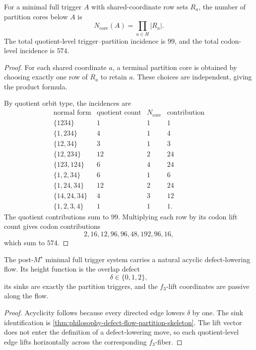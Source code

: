 \begin{theorem}
\label{thm:philosophy-partition-core-incidence}
For a minimal full trigger $A$ with shared-coordinate row sets $R_{a}$,
the number of partition cores below $A$ is
$$
  N_{\mathrm{core}}(A)
  =
  \prod_{a\in H}|R_{a}|.
$$
The total quotient-level trigger--partition incidence is $99$, and the
total codon-level incidence is $574$.
\end{theorem}
\begin{proof}
For each shared coordinate $a$, a terminal partition core is obtained by
choosing exactly one row of $R_{a}$ to retain $a$. These choices are
independent, giving the product formula.

By quotient orbit type, the incidences are
$$
\begin{array}{c|r|r|r}
  \text{normal form} & \text{quotient count} & N_{\mathrm{core}} & \text{contribution}\\
  \hline
  \{1234\} & 1 & 1 & 1\\
  \{1,234\} & 4 & 1 & 4\\
  \{12,34\} & 3 & 1 & 3\\
  \{12,234\} & 12 & 2 & 24\\
  \{123,124\} & 6 & 4 & 24\\
  \{1,2,34\} & 6 & 1 & 6\\
  \{1,24,34\} & 12 & 2 & 24\\
  \{14,24,34\} & 4 & 3 & 12\\
  \{1,2,3,4\} & 1 & 1 & 1.
\end{array}
$$
The quotient contributions sum to $99$. Multiplying each row by its
codon lift count gives codon contributions
$$
  2,16,12,96,96,48,192,96,16,
$$
which sum to $574$.
\end{proof}

\begin{theorem}
\label{thm:philosophy-defect-flow-theorem}
The post-$M^{\star}$ minimal full trigger system carries a natural
acyclic defect-lowering flow. Its height function is the overlap defect
$$
  \delta\in\{0,1,2\},
$$
its sinks are exactly the partition triggers, and the $f_{3}$-lift
coordinates are passive along the flow.
\end{theorem}
\begin{proof}
Acyclicity follows because every directed edge lowers $\delta$ by one.
The sink identification is
\autoref{thm:philosophy-defect-flow-partition-skeleton}. The lift vector
does not enter the definition of a defect-lowering move, so each
quotient-level edge lifts horizontally across the corresponding
$f_{3}$-fiber.
\end{proof}
